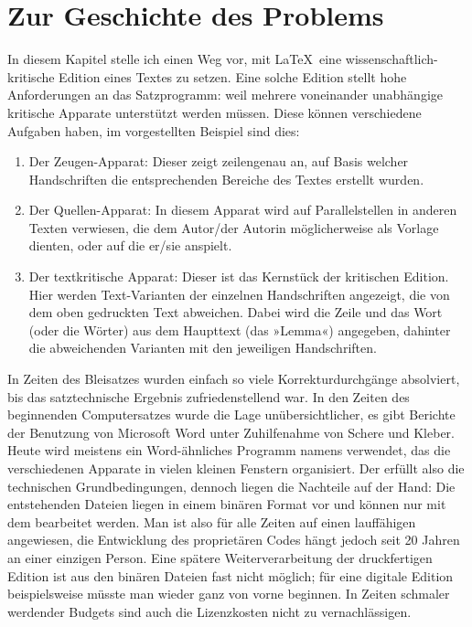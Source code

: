 \section{Zur Geschichte des Problems}

In diesem Kapitel stelle ich einen Weg vor, mit \LaTeX\ eine wissenschaftlich-kritische Edition eines Textes zu setzen. Eine solche Edition stellt hohe Anforderungen an das Satzprogramm: weil mehrere voneinander unabhängige kritische Apparate unterstützt werden müssen. Diese können verschiedene Aufgaben haben, im vorgestellten Beispiel sind dies:

\begin{enumerate}\label{pil:apparat}
\item Der Zeugen-Apparat: Dieser zeigt zeilengenau an, auf Basis welcher Handschriften die entsprechenden Bereiche des Textes erstellt wurden.

\item Der Quellen-Apparat: In diesem Apparat wird auf Parallelstellen in anderen Texten verwiesen, die dem Autor/der Autorin 
möglicherweise als Vorlage dienten, oder auf die er/sie anspielt.

\item Der textkritische Apparat: Dieser ist das Kernstück der kritischen Edition. Hier werden Text-Varianten der einzelnen Handschriften angezeigt, die von dem oben gedruckten Text 
abweichen. 
Dabei wird die Zeile und das 
Wort (oder die Wörter) aus dem Haupttext (das »Lemma«) angegeben, dahinter die 
abweichenden Varianten mit den jeweiligen Handschriften.
\end{enumerate}

In Zeiten des Bleisatzes wurden einfach so viele Korrekturdurchgänge absolviert, 
bis das satztechnische Ergebnis zufriedenstellend war. In den Zeiten des beginnenden 
Computersatzes wurde die Lage unübersichtlicher, es gibt Berichte der 
Benutzung von Microsoft Word unter 
Zuhilfenahme von Schere und Kleber.~\cite[34]{stockhausen:mde2016/2} Heute wird meistens 
ein Word-ähnliches Programm namens  verwendet, 
das die verschiedenen Apparate in vielen kleinen Fenstern organisiert. 
Der  erfüllt also die technischen Grundbedingungen, dennoch liegen die 
Nachteile auf der Hand: Die entstehenden Dateien liegen in einem binären Format 
vor und können nur mit dem  bearbeitet werden. 
Man ist also für alle Zeiten auf einen lauffähigen  angewiesen, 
die Entwicklung des proprietären Codes hängt jedoch seit 20 Jahren an einer einzigen Person.
Eine spätere Weiterverarbeitung der druckfertigen Edition ist aus den binären Dateien 
fast nicht möglich; für eine digitale Edition beispielsweise müsste man wieder ganz von vorne beginnen.
In Zeiten schmaler werdender Budgets sind auch die Lizenzkosten nicht zu vernachlässigen.

